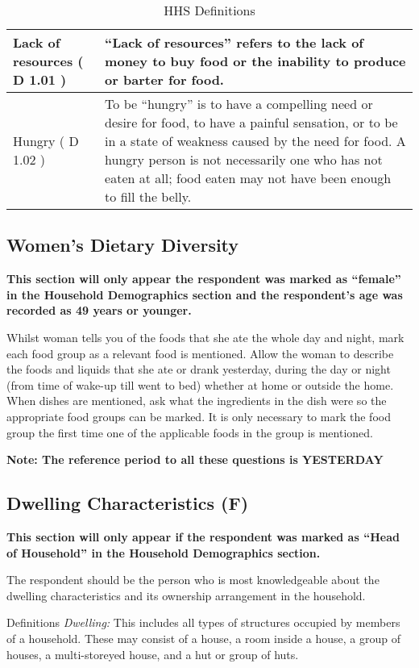 \documentclass[a4paper]{refart}
\newenvironment{fulltable}[1][tbp]
 {\begin{table}[#1]%
  \hspace*{-\leftmarginwidth}%
  \begin{minipage}{\fullwidth}}
 {\end{minipage}\end{table}}
\begin{document}
\begin{fulltable}
\begin{tabularx}{\textwidth}{| X | X |}
Lack of resources ( D 1.01 ) &
``Lack of resources'' refers to the lack of money to buy food or the inability to produce or barter for food. \\ \hline
Hungry ( D 1.02 ) &
To be “hungry” is to have a compelling need or desire for food, to have a painful sensation, or to be in a state of weakness caused by the need for food. A hungry person is not necessarily one who has not eaten at all; food eaten may not have been enough to fill the belly. \\ \hline
\end{tabularx}
\caption{HHS Definitions}
\label{hhstable}
\end{fulltable}

\subsection{Women's Dietary Diversity}
\textbf{This section will only appear the respondent was marked as ``female'' in the Household Demographics section and the respondent's age was recorded as 49 years or younger.}

Whilst woman tells you of the foods that she ate the whole day and night, mark each food group as a relevant food is mentioned. Allow the  woman to describe the foods and liquids that she ate or drank yesterday, during the day or night (from time of wake-up till went to bed) whether at home or outside the home. When dishes are mentioned, ask what the ingredients in the dish were so the appropriate food groups can be marked. It is only necessary to mark the food group the first time one of the applicable foods in the group is mentioned.

\textbf{Note: The reference period to all these questions is YESTERDAY}

\subsection{Dwelling Characteristics (F)}
\textbf{This section will only appear if the respondent was marked as ``Head of Household'' in the Household Demographics section.}

The respondent should be the person who is most knowledgeable about the dwelling characteristics and its ownership arrangement in the household.

Definitions
\textit{Dwelling:} This includes all types of structures occupied by members of a household. These may consist of a house, a room inside a house, a group of houses, a multi-storeyed house, and a hut or group of huts.
\end{document}
